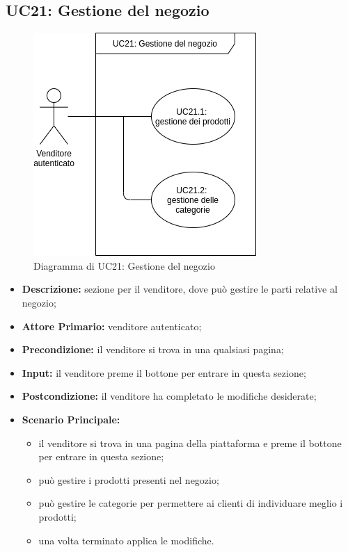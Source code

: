         \subsection{UC21: Gestione del negozio}
        \label{sec:UC21}
        \begin{figure}[!ht]
            \caption{Diagramma di UC21: Gestione del negozio}
            \vspace{10px}
            \includegraphics[scale=0.5]{../../../Images/AnalisiRequisiti/UC21}
            \centering
        \end{figure}
        \begin{itemize}
            \item \textbf{Descrizione:} sezione per il venditore, dove può gestire le parti relative al negozio;
            \item \textbf{Attore Primario:} venditore autenticato;
            \item \textbf{Precondizione:} il venditore si trova in una qualsiasi pagina;
            \item \textbf{Input:} il venditore preme il bottone per entrare in questa sezione;
            \item \textbf{Postcondizione:} il venditore ha completato le modifiche desiderate;
            \item \textbf{Scenario Principale:} 
                \begin{itemize}
                    \item il venditore si trova in una pagina della piattaforma e preme il bottone per entrare in questa sezione;
                    \item può gestire i prodotti presenti nel negozio;
                    \item può gestire le categorie per permettere ai clienti di individuare meglio i prodotti;
                    \item una volta terminato applica le modifiche.
                \end{itemize}
        \end{itemize}
